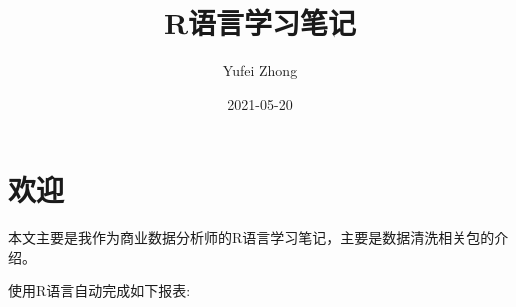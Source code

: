 \documentclass[
]{book}
\title{R语言学习笔记}
\author{Yufei Zhong}
\date{2021-05-20}
\begin{document}
\maketitle

{
\setcounter{tocdepth}{1}
\tableofcontents
}
\hypertarget{welcome}{%
\chapter*{欢迎}\label{welcome}}

本文主要是我作为商业数据分析师的R语言学习笔记，主要是数据清洗相关包的介绍。

使用R语言自动完成如下报表:

\providecommand{\docline}[3]{\noalign{\global\setlength{\arrayrulewidth}{#1}}\arrayrulecolor[HTML]{#2}\cline{#3}}

\setlength{\tabcolsep}{2pt}

\renewcommand*{\arraystretch}{1.5}
\end{document}
